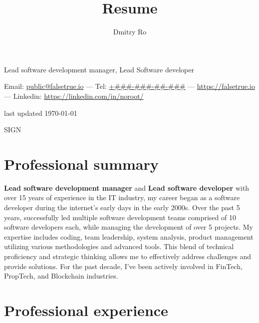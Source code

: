 \documentclass[9pt]{extarticle}
\makeatletter
\def\name{Dmitry Ro}
\def\email{public@falsetrue.io}
\def\site{https://falsetrue.io}
\def\linkedin{https://linkedin.com/in/noroot/}
\def\telephone{+\#\#\#-\#\#\#-\#\#-\#\#\#}
\def\roletitle{Lead software development manager, Lead Software developer}
\renewcommand{\maketitle}{
  \begin{center}
    {\huge\bfseries
      \theauthor}
    \vspace{.25em}

    \roletitle

    Email: \href{mailto:\email}{\email}
    ---
    Tel: \href{tel:\telephone}{\telephone}
    ---
    \href{\site?from=cv&h=SIGN}{\site}
    ---
    Linkedin: \href{\linkedin}{\linkedin}
    \vspace{0.25em}

    last updated \today

    \vspace{0.5em}
    SIGN
    \vspace{0.5em}

  \end{center}
}
\makeatother
\begin{document}
\title{Resume}
\author{\name}
\maketitle
\section{Professional summary}
\textbf{Lead software development manager} and \textbf{Lead software developer} with over 15 years of experience in the IT industry, my career began as a software developer during the internet's early days in the early 2000s.
Over the past 5 years, successfully led multiple software development teams comprised of 10 software developers each, while managing the development of over 5 projects. My expertise includes coding, team leadership, system analysis, product management utilizing various methodologies and advanced tools. This blend of technical proficiency and strategic thinking allows me to effectively address challenges and provide solutions. For the past decade, I've been actively involved in FinTech, PropTech, and Blockchain industries.



\section{Professional experience}
\end{document}
